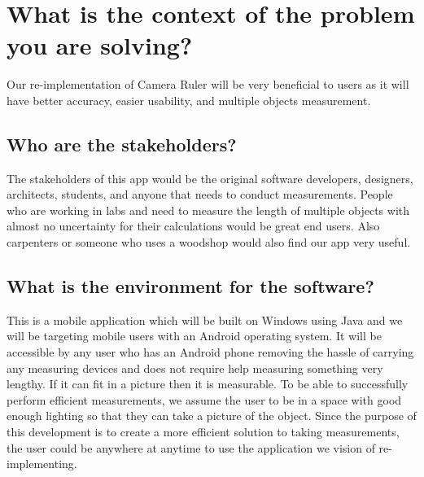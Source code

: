 \documentclass{article}
\begin{document}
\section{What is the context of the problem you are solving?}
Our re-implementation of Camera Ruler will be very beneficial to users as it will have better accuracy, easier usability, and multiple objects measurement.
\subsection{Who are the stakeholders?}
The stakeholders of this app would be the original software developers, designers, architects, students, and anyone that needs to conduct measurements. People who are working in labs and need to measure the length of multiple objects with almost no uncertainty for their calculations would be great end users. Also carpenters or someone who uses a woodshop would also find our app very useful. 
\subsection{What is the environment for the software?}
This is a mobile application which will be built on Windows using Java and we will be targeting mobile users with an Android operating system. It will be accessible by any user who has an Android phone removing the hassle of carrying any measuring devices and does not require help measuring something very lengthy. If it can fit in a picture then it is measurable. {\color{red} To be able to successfully perform efficient measurements, we assume the user to be in a space with good enough lighting so that they can take a picture of the object. Since the purpose of this development is to create a more efficient solution to taking measurements, the user could be anywhere at anytime to use the application we vision of re-implementing.}
\end{document}
